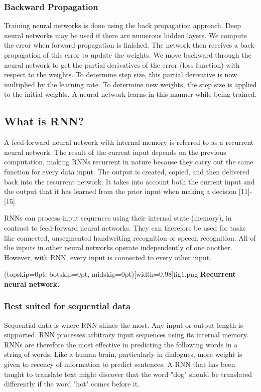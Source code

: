 \documentclass{ieeeaccess}
\begin{document}
\subsubsection{Backward Propagation}
Training neural networks is done using the back propagation approach. Deep neural networks may be used if there are numerous hidden layers. We compute the error when forward propagation is finished. The network then receives a back-propagation of this error to update the weights. We move backward through the neural network to get the partial derivatives of the error (loss function) with respect to the weights. To determine step size, this partial derivative is now multiplied by the learning rate. To determine new weights, the step size is applied to the initial weights. A neural network learns in this manner while being trained.

\subsection{What is RNN?}
A feed-forward neural network with internal memory is referred to as a recurrent neural network. The result of the current input depends on the previous computation, making RNNs recurrent in nature because they carry out the same function for every data input. The output is created, copied, and then delivered back into the recurrent network. It takes into account both the current input and the output that it has learned from the prior input when making a decision [11]-[15].

RNNs can process input sequences using their internal state (memory), in contrast to feed-forward neural networks. They can therefore be used for tasks like connected, unsegmented handwriting recognition or speech recognition. All of the inputs in other neural networks operate independently of one another. However, with RNN, every input is connected to every other input.

\Figure[t!](topskip=0pt, botskip=0pt, midskip=0pt)[width=0.98\linewidth]{fig1.png}
{ \textbf{Recurrent neural network.}\label{fig1}}

\subsubsection{Best suited for sequential data}
Sequential data is where RNN shines the most. Any input or output length is supported. RNN processes arbitrary input sequences using its internal memory. RNNs are therefore the most effective in predicting the following words in a string of words. Like a human brain, particularly in dialogues, more weight is given to recency of information to predict sentences. A RNN that has been taught to translate text might discover that the word "dog" should be translated differently if the word "hot" comes before it.
\end{document}
